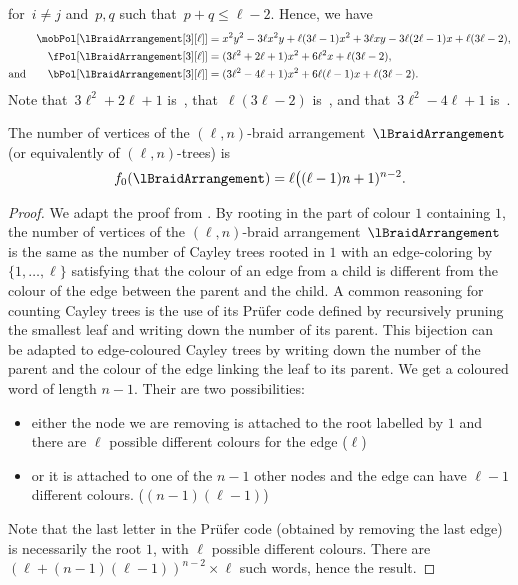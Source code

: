\begin{example}
\[\]
for~$i \ne j$ and~$p, q$ such that~$p + q \le \ell-2$.
Hence, we have
\begin{align*}
\mobPol[{\lBraidArrangement[3][\ell]}] & = x^2 y^2 - 3 \ell x^2 y + \ell (3 \ell - 1) x^2 + 3 \ell x y - 3 \ell (2 \ell - 1) x + \ell (3 \ell - 2) , \\
\fPol[{\lBraidArrangement[3][\ell]}] & = (3 \ell^2 + 2 \ell + 1) x^2 + 6 \ell^2 x + \ell (3 \ell - 2), \\
\text{and}\qquad
\bPol[{\lBraidArrangement[3][\ell]}] & = (3 \ell^2 - 4 \ell + 1) x^2 + 6 \ell (\ell - 1) x + \ell (3 \ell - 2).
\end{align*}
Note that~$3 \ell^2 + 2 \ell + 1$ is~, that~$\ell (3 \ell - 2)$ is~, and that~$3 \ell^2 - 4 \ell + 1$ is~.
\end{example}

\begin{theorem}
\label{thm:verticeslnBraidArrangement}
The number of vertices of the $(\ell,n)$-braid arrangement~$\lBraidArrangement$ (or equivalently of $(\ell,n)$-trees) is
\[
f_0(\lBraidArrangement) = \ell \big( (\ell-1) n + 1)^{n-2}.
\]
\end{theorem}

\begin{proof}
 
We adapt the proof from \cite{CKSS04}. By rooting in the part of colour $1$ containing $1$, the number of vertices of the $(\ell,n)$-braid arrangement~$\lBraidArrangement$ is the same as the number of Cayley trees rooted in $1$ with an edge-coloring by $\{1, \ldots, \ell\}$ satisfying that the colour of an edge from a child is different from the colour of the edge between the parent and the child. A common reasoning for counting Cayley trees is the use of its Prüfer code defined by recursively pruning the smallest leaf and writing down the number of its parent. This bijection can be adapted to edge-coloured Cayley trees by writing down the number of the parent and the colour of the edge linking the leaf to its parent. We get a coloured word of length $n-1$. Their are two possibilities:
\begin{itemize}
\item either the node we are removing is attached to the root labelled by $1$ and there are $\ell$ possible different colours for the edge ($\ell$)
\item or it is attached to one of the $n-1$ other nodes and the edge can have $\ell-1$ different colours. ($(n-1)(\ell-1)$)
\end{itemize}
 Note that the last letter in the Prüfer code (obtained by removing the last edge) is necessarily the root $1$, with $\ell$ possible different colours.
 There are $(\ell+(n-1)(\ell-1))^{n-2} \times \ell$ such words, hence the result.
\end{proof}

